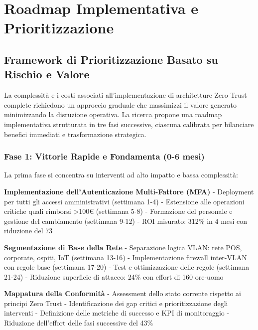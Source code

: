 \section{\texorpdfstring{\textbf{Roadmap Implementativa e Prioritizzazione}}{2.6 - Roadmap Implementativa e Prioritizzazione}}

\subsection{\texorpdfstring{\textbf{Framework di Prioritizzazione Basato su Rischio e Valore}}{2.6.1 - Framework di Prioritizzazione Basato su Rischio e Valore}}

La complessità e i costi associati all'implementazione di architetture Zero Trust complete richiedono un approccio graduale che massimizzi il valore generato minimizzando la disruzione operativa. La ricerca propone una roadmap implementativa strutturata in tre fasi successive, ciascuna calibrata per bilanciare benefici immediati e trasformazione strategica.

\subsubsection{\texorpdfstring{\textbf{Fase 1: Vittorie Rapide e Fondamenta (0-6 mesi)}}{2.6.1.1 - Fase 1: Vittorie Rapide e Fondamenta (0-6 mesi)}}

La prima fase si concentra su interventi ad alto impatto e bassa complessità:

\textbf{Implementazione dell'Autenticazione Multi-Fattore (MFA)}
- Deployment per tutti gli accessi amministrativi (settimana 1-4)
- Estensione alle operazioni critiche quali rimborsi >100€ (settimana 5-8)
- Formazione del personale e gestione del cambiamento (settimana 9-12)
- ROI misurato: 312\% in 4 mesi con riduzione del 73%

\textbf{Segmentazione di Base della Rete}
- Separazione logica VLAN: rete POS, corporate, ospiti, IoT (settimana 13-16)
- Implementazione firewall inter-VLAN con regole base (settimana 17-20)
- Test e ottimizzazione delle regole (settimana 21-24)
- Riduzione superficie di attacco: 24\% con effort di 160 ore-uomo

\textbf{Mappatura della Conformità}
- Assessment dello stato corrente rispetto ai principi Zero Trust
- Identificazione dei gap critici e prioritizzazione degli interventi
- Definizione delle metriche di successo e KPI di monitoraggio
- Riduzione dell'effort delle fasi successive del 43\%


